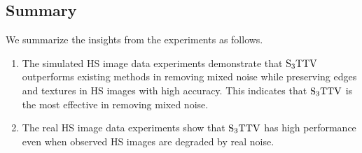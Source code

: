 \subsection{Summary}
\label{subsec:Expt_summary}
We summarize the insights from the experiments as follows.
\begin{enumerate}
	\item The simulated HS image data experiments demonstrate that ${\text{S}_{3} \text{TTV}}$ outperforms existing methods in removing mixed noise while preserving edges and textures in HS images with high accuracy. 
	This indicates that ${\text{S}_{3} \text{TTV}}$ is the most effective in removing mixed noise.
	\item The real HS image data experiments show that ${\text{S}_{3} \text{TTV}}$ has high performance even when observed HS images are degraded by real noise.
\end{enumerate}


